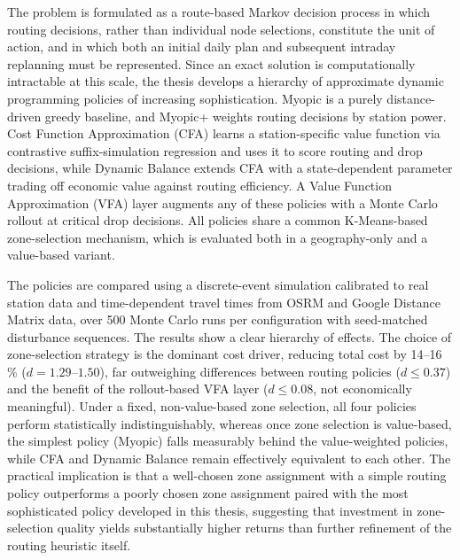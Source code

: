 \documentclass[12pt,oneside]{article}
\begin{document}
The problem is formulated as a route-based Markov decision process in which routing decisions, rather than individual node selections, constitute the unit of action, and in which both an initial daily plan and subsequent intraday replanning must be represented. Since an exact solution is computationally intractable at this scale, the thesis develops a hierarchy of approximate dynamic programming policies of increasing sophistication. Myopic is a purely distance-driven greedy baseline, and Myopic+ weights routing decisions by station power. Cost Function Approximation (CFA) learns a station-specific value function via contrastive suffix-simulation regression and uses it to score routing and drop decisions, while Dynamic Balance extends CFA with a state-dependent parameter trading off economic value against routing efficiency. A Value Function Approximation (VFA) layer augments any of these policies with a Monte Carlo rollout at critical drop decisions. All policies share a common K-Means-based zone-selection mechanism, which is evaluated both in a geography-only and a value-based variant.

The policies are compared using a discrete-event simulation calibrated to real station data and time-dependent travel times from OSRM and Google Distance Matrix data, over 500 Monte Carlo runs per configuration with seed-matched disturbance sequences. The results show a clear hierarchy of effects. The choice of zone-selection strategy is the dominant cost driver, reducing total cost by 14--16\,\% ($d = 1.29$--$1.50$), far outweighing differences between routing policies ($d \leq 0.37$) and the benefit of the rollout-based VFA layer ($d \leq 0.08$, not economically meaningful). Under a fixed, non-value-based zone selection, all four policies perform statistically indistinguishably, whereas once zone selection is value-based, the simplest policy (Myopic) falls measurably behind the value-weighted policies, while CFA and Dynamic Balance remain effectively equivalent to each other. The practical implication is that a well-chosen zone assignment with a simple routing policy outperforms a poorly chosen zone assignment paired with the most sophisticated policy developed in this thesis, suggesting that investment in zone-selection quality yields substantially higher returns than further refinement of the routing heuristic itself.


\clearpage
{}  
    \setcounter{page}{1}
\lhead{\nouppercase{\leftmark}}
\end{document}
